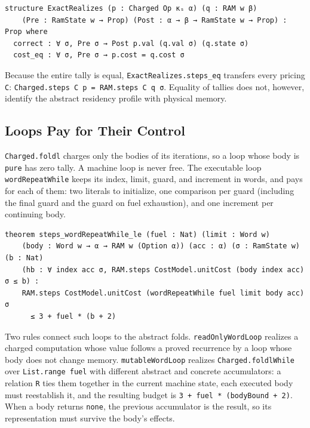 \documentclass[acmsmall,nonacm]{acmart}
\begin{document}
\begin{lstlisting}
structure ExactRealizes (p : Charged Op κₛ α) (q : RAM w β)
    (Pre : RamState w → Prop) (Post : α → β → RamState w → Prop) : Prop where
  correct : ∀ σ, Pre σ → Post p.val (q.val σ) (q.state σ)
  cost_eq : ∀ σ, Pre σ → p.cost = q.cost σ
\end{lstlisting}

Because the entire tally is equal, \lstinline{ExactRealizes.steps_eq} transfers every pricing \lstinline{C}: \lstinline{Charged.steps C p = RAM.steps C q σ}.
Equality of tallies does not, however, identify the abstract residency profile with physical memory.

\subsection{Loops Pay for Their Control}\label{sec:loops}

\lstinline{Charged.foldl} charges only the bodies of its iterations, so a loop whose body is \lstinline{pure} has zero tally.
A machine loop is never free.
The executable loop \lstinline{wordRepeatWhile} keeps its index, limit, guard, and increment in words, and pays for each of them: two literals to initialize, one comparison per guard (including the final guard and the guard on fuel exhaustion), and one increment per continuing body.

\begin{lstlisting}
theorem steps_wordRepeatWhile_le (fuel : Nat) (limit : Word w)
    (body : Word w → α → RAM w (Option α)) (acc : α) (σ : RamState w) (b : Nat)
    (hb : ∀ index acc σ, RAM.steps CostModel.unitCost (body index acc) σ ≤ b) :
    RAM.steps CostModel.unitCost (wordRepeatWhile fuel limit body acc) σ
      ≤ 3 + fuel * (b + 2)
\end{lstlisting}

Two rules connect such loops to the abstract folds.
\lstinline{readOnlyWordLoop} realizes a charged computation whose value follows a proved recurrence by a loop whose body does not change memory.
\lstinline{mutableWordLoop} realizes \lstinline{Charged.foldlWhile} over \lstinline{List.range fuel} with different abstract and concrete accumulators: a relation \lstinline{R} ties them together in the current machine state, each executed body must reestablish it, and the resulting budget is \lstinline{3 + fuel * (bodyBound + 2)}.
When a body returns \lstinline{none}, the previous accumulator is the result, so its representation must survive the body's effects.
\end{document}
